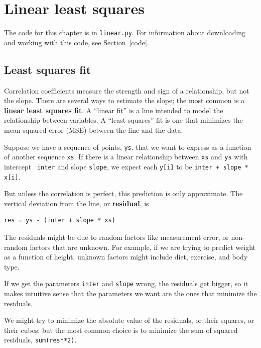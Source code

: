 \documentclass[12pt]{book}
\theoremstyle{exercise}
\begin{document}
\chapter{Linear least squares}%
\label{linear}

The code for this chapter is in {\tt linear.py}.  For information
about downloading and working with this code, see Section~\ref{code}.


\section{Least squares fit}

Correlation coefficients measure the strength and sign of a
relationship, but not the slope.  There are several ways to estimate
the slope; the most common is a {\bf linear least squares fit}.  A
``linear fit'' is a line intended to model the relationship between
variables.  A ``least squares'' fit is one that minimizes the mean
squared error (MSE) between the line and the data.%
%
%

Suppose we have a sequence of points, {\tt ys}, that we want to
express as a function of another sequence {\tt xs}.  If there is a
linear relationship between {\tt xs} and {\tt ys} with intercept {\tt
  inter} and slope {\tt slope}, we expect each {\tt y[i]} to be
{\tt inter + slope * x[i]}.%

But unless the correlation is perfect, this prediction is only
approximate.  The vertical deviation from the line, or {\bf residual},
is%

\begin{verbatim}
res = ys - (inter + slope * xs)
\end{verbatim}

The residuals might be due to random factors like measurement error,
or non-random factors that are unknown.  For example, if we are
trying to predict weight as a function of height, unknown factors
might include diet, exercise, and body type.%
%
%

If we get the parameters {\tt inter} and {\tt slope} wrong, the residuals
get bigger, so it makes intuitive sense that the parameters we want
are the ones that minimize the residuals.%

We might try to minimize the absolute value of the
residuals, or their squares, or their cubes; but the most common
choice is to minimize the sum of squared residuals,
{\tt sum(res**2)}.
\end{document}
